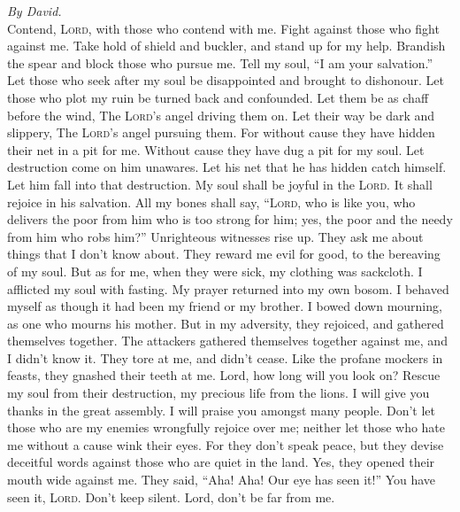 \emph{By David.}\\
 Contend, \textsc{Lord}, with those who contend with me.
Fight against those who fight against me.  Take hold of
shield and buckler, and stand up for my help.  Brandish
the spear and block those who pursue me. Tell my soul, ``I am your
salvation.''  Let those who seek after my soul be
disappointed and brought to dishonour. Let those who plot my ruin be
turned back and confounded.  Let them be as chaff before
the wind, The \textsc{Lord}'s angel driving them on.  Let
their way be dark and slippery, The \textsc{Lord}'s angel pursuing them.
 For without cause they have hidden their net in a pit for
me. Without cause they have dug a pit for my soul.  Let
destruction come on him unawares. Let his net that he has hidden catch
himself. Let him fall into that destruction.  My soul
shall be joyful in the \textsc{Lord}. It shall rejoice in his salvation.
 All my bones shall say, ``\textsc{Lord}, who is like
you, who delivers the poor from him who is too strong for him; yes, the
poor and the needy from him who robs him?''  Unrighteous
witnesses rise up. They ask me about things that I don't know about.
 They reward me evil for good, to the bereaving of my
soul.  But as for me, when they were sick, my clothing
was sackcloth. I afflicted my soul with fasting. My prayer returned into
my own bosom.  I behaved myself as though it had been my
friend or my brother. I bowed down mourning, as one who mourns his
mother.  But in my adversity, they rejoiced, and gathered
themselves together. The attackers gathered themselves together against
me, and I didn't know it. They tore at me, and didn't cease.
 Like the profane mockers in feasts, they gnashed their
teeth at me.  Lord, how long will you look on? Rescue my
soul from their destruction, my precious life from the lions.
 I will give you thanks in the great assembly. I will
praise you amongst many people.  Don't let those who are
my enemies wrongfully rejoice over me; neither let those who hate me
without a cause wink their eyes.  For they don't speak
peace, but they devise deceitful words against those who are quiet in
the land.  Yes, they opened their mouth wide against me.
They said, ``Aha! Aha! Our eye has seen it!''  You have
seen it, \textsc{Lord}. Don't keep silent. Lord, don't be far from me.

